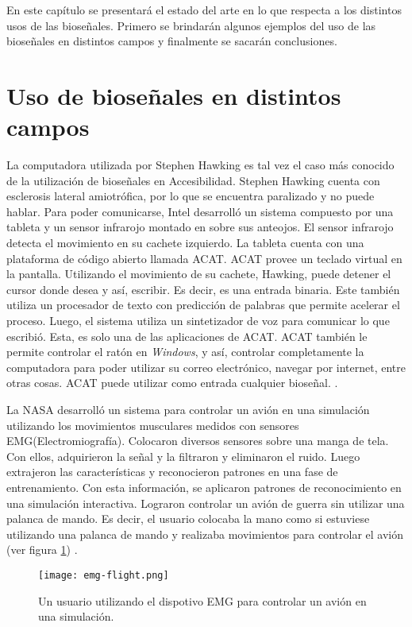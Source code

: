 En este capítulo se presentará el estado del arte en lo que respecta a los distintos usos de las bioseñales. Primero se brindarán algunos ejemplos del uso de las bioseñales en distintos campos y finalmente se sacarán conclusiones. 

\section{Uso de bioseñales en distintos campos}

La computadora utilizada por Stephen Hawking es tal vez el caso más conocido de la utilización de bioseñales en Accesibilidad. Stephen Hawking cuenta con esclerosis lateral amiotrófica, por lo que se encuentra paralizado y no puede hablar. Para poder comunicarse, Intel desarrolló un sistema compuesto por una tableta y un sensor infrarojo montado en sobre sus anteojos. El sensor infrarojo detecta el movimiento en su cachete izquierdo. La tableta cuenta con una plataforma de código abierto llamada ACAT. ACAT provee un teclado virtual en la pantalla. Utilizando el movimiento de su cachete, Hawking, puede detener el cursor donde desea y así, escribir. Es decir, es una entrada binaria. Este también utiliza un procesador de texto con predicción de palabras que permite acelerar el proceso.  Luego, el sistema utiliza un sintetizador de voz para comunicar lo que escribió. Esta, es solo una de las aplicaciones de ACAT. ACAT también le permite controlar el ratón en \emph{Windows}, y así, controlar completamente la computadora para poder utilizar su correo electrónico, navegar por internet, entre otras cosas. ACAT puede utilizar como entrada cualquier bioseñal. \cite{hawking}.

La NASA desarrolló un sistema para controlar un avión en una simulación utilizando los movimientos musculares medidos con sensores EMG(Electromiografía). Colocaron diversos sensores sobre una manga de tela. Con ellos, adquirieron la señal y la filtraron y eliminaron el ruido. Luego extrajeron las características y reconocieron patrones en una fase de entrenamiento. Con esta información, se aplicaron patrones de reconocimiento en una simulación interactiva. Lograron controlar un avión de guerra sin utilizar una palanca de mando. Es decir, el usuario colocaba la mano como si estuviese utilizando una palanca de mando y realizaba movimientos para controlar el avión (ver figura \ref{fig:emg-flight}) \cite{emg-flight}.

\begin{figure}[H]
	\centering
    \texttt{[image: emg-flight.png]}
    \caption{Un usuario utilizando el dispotivo EMG para controlar un avión en una simulación.}
	\label{fig:emg-flight}
\end{figure}


